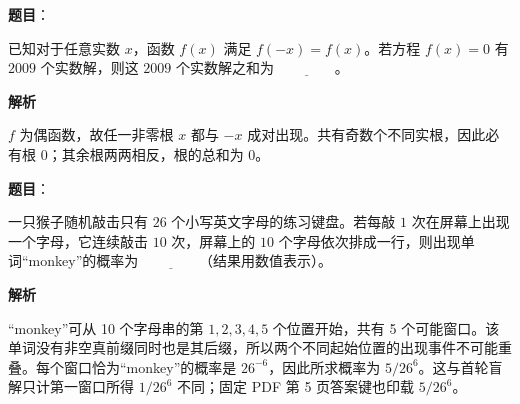 \begin{answer}

\textbf{题目}：

已知对于任意实数 $x$，函数 $f(x)$ 满足 $f(-x)=f(x)$。若方程 $f(x)=0$ 有 $2009$ 个实数解，则这 $2009$ 个实数解之和为 $\underline{\qquad\qquad}$。

\textbf{解析}

$f$ 为偶函数，故任一非零根 $x$ 都与 $-x$ 成对出现。共有奇数个不同实根，因此必有根 $0$；其余根两两相反，根的总和为 $0$。


\end{answer}
\begin{answer}

\textbf{题目}：

一只猴子随机敲击只有 $26$ 个小写英文字母的练习键盘。若每敲 $1$ 次在屏幕上出现一个字母，它连续敲击 $10$ 次，屏幕上的 $10$ 个字母依次排成一行，则出现单词“monkey”的概率为 $\underline{\qquad\qquad}$（结果用数值表示）。

\textbf{解析}

“monkey”可从 10 个字母串的第 $1,2,3,4,5$ 个位置开始，共有 5 个可能窗口。该单词没有非空真前缀同时也是其后缀，所以两个不同起始位置的出现事件不可能重叠。每个窗口恰为“monkey”的概率是 $26^{-6}$，因此所求概率为 $5/26^6$。这与首轮盲解只计第一窗口所得 $1/26^6$ 不同；固定 PDF 第 5 页答案键也印载 $5/26^6$。


\end{answer}
